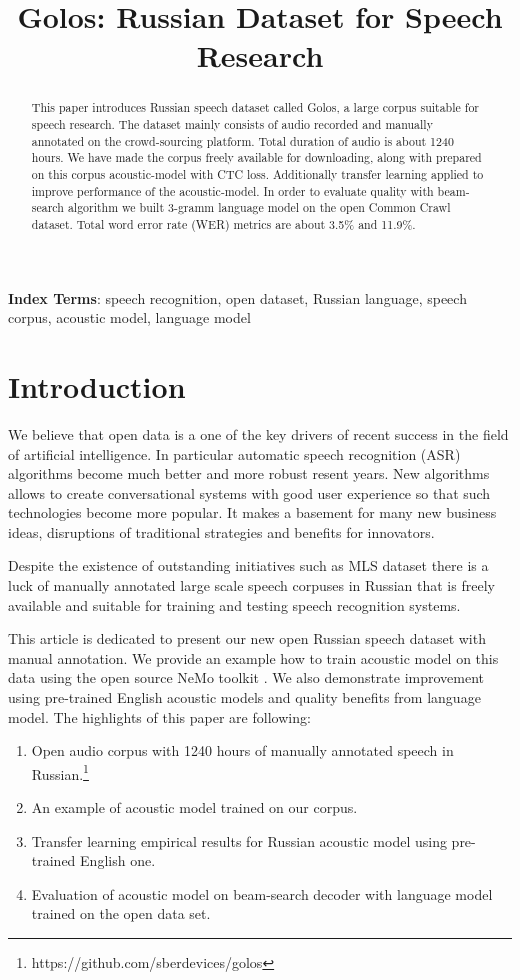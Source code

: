 \documentclass[a4paper]{article}
\title{Golos: Russian Dataset for Speech Research}
\begin{document}
\maketitle
% 
\begin{abstract}
 
  This paper introduces Russian speech dataset called Golos, a large corpus suitable for speech research. The dataset mainly consists of audio recorded and manually annotated on the crowd-sourcing platform. Total duration of audio is about 1240 hours. We have made the corpus freely available for downloading, along with prepared on this corpus acoustic-model with CTC loss. Additionally transfer learning applied to improve performance of the acoustic-model. In order to evaluate quality with beam-search algorithm we built 3-gramm language model on the open Common Crawl dataset. Total word error rate (WER) metrics are about 3.5\% and 11.9\%.
  
  
\end{abstract}
\noindent\textbf{Index Terms}: speech recognition, open dataset, Russian language, speech corpus, acoustic model, language model

\section{Introduction}
 We believe that open data is a one of the key drivers of recent success in the field of artificial intelligence. In particular automatic speech recognition (ASR) algorithms become much better and more robust resent years. New algorithms allows to create conversational systems with good user experience so that such technologies become more popular. It makes a basement for many new business ideas, disruptions of traditional strategies and benefits for innovators.
  
 Despite the existence of outstanding initiatives such as MLS dataset \cite{pratap2020mls} there is a luck of manually annotated large scale speech corpuses in Russian that is freely available and suitable for training and testing speech recognition systems.
 
 This article is dedicated to present our new open Russian speech dataset with manual annotation. We provide an example how to train acoustic model on this data using the open source NeMo toolkit \cite{kuchaiev2019nemo}. We also demonstrate improvement using pre-trained English acoustic models and quality benefits from language model. The highlights of this paper are following:
\begin{enumerate}
\item Open audio corpus with 1240 hours of manually annotated speech in Russian.\footnote{https://github.com/sberdevices/golos}
\item An example of acoustic model trained on our corpus.
\item Transfer learning empirical results for Russian acoustic model using pre-trained English one.
\item Evaluation of acoustic model on beam-search decoder with language model trained on the open data set.
\end{enumerate}
\end{document}
